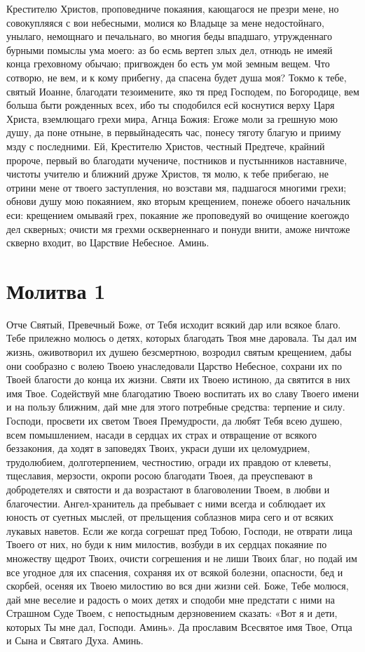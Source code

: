 Крестителю Христов, проповедниче покаяния, кающагося не презри мене, но совокупляяся с вои небесными, молися ко Владыце за мене недостойнаго, унылаго, немощнаго и печальнаго, во многия беды впадшаго, утружденнаго бурными помыслы ума моего: аз бо есмь вертеп злых дел, отнюдь не имеяй конца греховному обычаю; пригвожден бо есть ум мой земным вещем. Что сотворю, не вем, и к кому прибегну, да спасена будет душа моя? Токмо к тебе, святый Иоанне, благодати тезоимените, яко тя пред Господем, по Богородице, вем больша быти рожденных всех, ибо ты сподобился есй коснутися верху Царя Христа, вземлющаго грехи мира, Агнца Божия: Егоже моли за грешную мою душу, да поне отныне, в первыйнадесять час, понесу тяготу благую и прииму мзду с последними. Ей, Крестителю Христов, честный Предтече, крайний пророче, первый во благодати мучениче, постников и пустынников наставниче, чистоты учителю и ближний друже Христов, тя молю, к тебе прибегаю, не отрини мене от твоего заступления, но возстави мя, падшагося многими грехи; обнови душу мою покаянием, яко вторым крещением, понеже обоего начальник еси: крещением омываяй грех, покаяние же проповедуяй во очищение коегождо дел скверных; очисти мя грехми оскверненнаго и понуди внити, аможе ничтоже скверно входит, во Царствие Небесное. Аминь.

\section{Молитва 1}
 


Отче Святый, Превечный Боже, от Тебя исходит всякий дар или всякое благо. Тебе прилежно молюсь о детях, которых благодать Твоя мне даровала. Ты дал им жизнь, оживотворил их душею безсмертною, возродил святым крещением, дабы они сообразно с волею Твоею унаследовали Царство Небесное, сохрани их по Твоей благости до конца их жизни. Святи их Твоею истиною, да святится в них имя Твое. Содействуй мне благодатию Твоею воспитать их во славу Твоего имени и на пользу ближним, дай мне для этого потребные средства: терпение и силу. Господи, просвети их светом Твоея Премудрости, да любят Тебя всею душею, всем помышлением, насади в сердцах их страх и отвращение от всякого беззакония, да ходят в заповедях Твоих, украси души их целомудрием, трудолюбием, долготерпением, честностию, огради их правдою от клеветы, тщеславия, мерзости, окропи росою благодати Твоея, да преуспевают в добродетелях и святости и да возрастают в благоволении Твоем, в любви и благочестии. Ангел-хранитель да пребывает с ними всегда и соблюдает их юность от суетных мыслей, от прельщения соблазнов мира сего и от всяких лукавых наветов. Если же когда согрешат пред Тобою, Господи, не отврати лица Твоего от них, но буди к ним милостив, возбуди в их сердцах покаяние по множеству щедрот Твоих, очисти согрешения и не лиши Твоих благ, но подай им все угодное для их спасения, сохраняя их от всякой болезни, опасности, бед и скорбей, осеняя их Твоею милостию во вся дни жизни сей. Боже, Тебе молюся, дай мне веселие и радость о моих детях и сподоби мне предстати с ними на Страшном Суде Твоем, с непостыдным дерзновением сказать: «Вот я и дети, которых Ты мне дал, Господи. Аминь». Да прославим Всесвятое имя Твое, Отца и Сына и Святаго Духа. Аминь.


